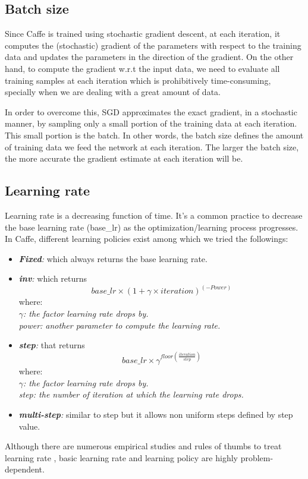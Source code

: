 \subsection{Batch size}

Since Caffe is trained using stochastic gradient descent, at each iteration, it computes the (stochastic) gradient of the parameters with respect to the training data and updates the parameters in the direction of the gradient. On the other hand, to compute the gradient w.r.t the input data, we need to evaluate all training samples at each iteration which is prohibitively time-consuming, specially when we are dealing with a great amount of data. 

\indent In order to overcome this, SGD approximates the exact gradient, in a stochastic manner, by sampling only a small portion of the training data at each iteration. This small portion is the batch. In other words, the batch size defines the amount of training data we feed the network at each iteration. The larger the batch size, the more accurate the gradient estimate at each iteration will be. 

\subsection{Learning rate}

Learning rate is a decreasing function of time. It's a common practice to decrease the base learning rate (base\_lr) as the optimization/learning process progresses. In Caffe, different learning policies exist among which we tried the followings:
\begin{itemize}
\item \textit{\textbf{Fixed}:} which always returns the base learning rate.
\item \textit{\textbf{inv}:} which returns $$base\_lr \times (1 + \gamma \times iteration) ^ {(-Power)}$$ where:\\\textit{ $\gamma$: the factor learning rate drops by.}\\\textit{power: another parameter to compute the learning rate.}
\item \textit{\textbf{step}:} that returns $$base\_lr \times \gamma ^ {floor(\frac{iteration}{step})}$$ where:\\ \textit{$\gamma$: the factor learning rate drops by.}\\\textit{step: the number of iteration at which the learning rate drops.} 
\item \textit{\textbf{multi-step}:} similar to step but it allows non uniform steps defined by step value.
\end{itemize}
Although there are numerous empirical studies and rules of thumbs to treat learning rate \cite{senior2013empirical,yu1995dynamic,minai1990acceleration}, basic learning rate and learning policy are highly problem-dependent.  


